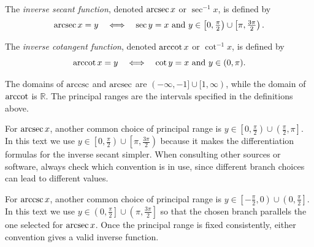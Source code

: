 \begin{definition}
The \emph{inverse secant function}, denoted \(\operatorname{arcsec} x\) or \(\sec^{-1} x\), is defined by
\[
\operatorname{arcsec} x = y \quad \Longleftrightarrow \quad \sec y = x \text{ and } y \in \left[0, \tfrac{\pi}{2}\right) \cup \left[\pi, \tfrac{3\pi}{2}\right).
\]
\end{definition}

\begin{definition}
The \emph{inverse cotangent function}, denoted \(\operatorname{arccot} x\) or \(\cot^{-1} x\), is defined by
\[
\operatorname{arccot} x = y \quad \Longleftrightarrow \quad \cot y = x \text{ and } y \in (0, \pi).
\]
\end{definition}

The domains of \(\operatorname{arccsc}\) and \(\operatorname{arcsec}\) are \((-\infty, -1] \cup [1, \infty)\), while the domain of \(\operatorname{arccot}\) is \(\mathbb{R}\). The principal ranges are the intervals specified in the definitions above.

\begin{remark}
For \(\operatorname{arcsec} x\), another common choice of principal range is \(y \in \left[0, \tfrac{\pi}{2}\right) \cup \left(\tfrac{\pi}{2}, \pi\right]\). In this text we use \(y \in \left[0, \tfrac{\pi}{2}\right) \cup \left[\pi, \tfrac{3\pi}{2}\right)\) because it makes the differentiation formulas for the inverse secant simpler. When consulting other sources or software, always check which convention is in use, since different branch choices can lead to different values.
\end{remark}

\begin{remark}
For \(\operatorname{arccsc} x\), another common choice of principal range is \(y \in \left[-\tfrac{\pi}{2}, 0\right) \cup \left(0, \tfrac{\pi}{2}\right]\). In this text we use \(y \in \left(0, \tfrac{\pi}{2}\right] \cup \left(\pi, \tfrac{3\pi}{2}\right]\) so that the chosen branch parallels the one selected for \(\operatorname{arcsec} x\). Once the principal range is fixed consistently, either convention gives a valid inverse function.
\end{remark}


